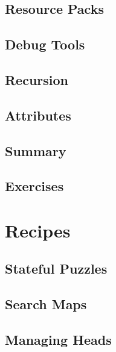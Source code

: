 \documentclass[oneside]{book}
\begin{document}
\section{Resource Packs}
\blindtext

\section{Debug Tools}
\blindtext

\section{Recursion}
\blindtext

\section{Attributes}
\blindtext

\section{Summary}
\blindtext

\section{Exercises}
\blindtext

\chapter{Recipes}

\section{Stateful Puzzles}
\blindtext

\section{Search Maps}
\blindtext

\section{Managing Heads}
\blindtext




\end{document}
